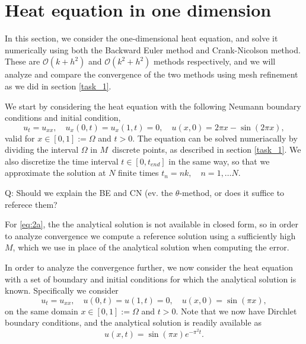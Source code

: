 \section{Heat equation in one dimension}
In this section, we consider the one-dimensional heat equation, 
and solve it numerically using both the Backward Euler method and Crank-Nicolson method. 
These are $\mathcal{O}(k+h^2)$ and $\mathcal{O}(k^2+h^2)$ methods respectively, 
and we will analyze and compare the convergence of the two methods using mesh refinement as we did in section \ref{task_1}. 

We start by considering the heat equation with the following Neumann boundary conditions and initial condition, 
\begin{equation*}
    u_t = u_{xx}, \quad u_x(0,t) = u_x(1,t) = 0, \quad u(x,0) = 2\pi x - \sin(2\pi x),
    \label{eq:2a}
\end{equation*}
valid for $x \in [0,1] := \Omega$ and $t > 0$.
The equation can be solved numeriacally by dividing the interval $\Omega$ in $M$ discrete points, 
as described in section \ref{task_1}.
We also discretize the time interval $t \in [0,t_{end}]$ in the same way, so that we approximate the solution at $N$ finite times $t_n = nk, \quad n = 1, \ldots N$.

\begin{figure}[ht]
    \centering
    
\end{figure}

Q: Should we explain the BE and CN (ev. the $\theta$-method, or does it suffice to referece them?

For \eqref{eq:2a}, the the analytical solution is not available in closed form, 
so in order to analyze convergence we compute a reference solution using a sufficiently high $M$, 
which we use in place of the analytical solution when computing the error. 

\begin{figure}[ht]
    \centering
    
\end{figure}

In order to analyze the convergence further, 
we now consider the heat equation with a set of boundary and initial conditions for which the analytical solution is known. 
Specifically we consider 
\begin{equation}
    u_t = u_{xx}, \quad u(0,t) = u(1,t) = 0, \quad u(x,0) = \sin(\pi x), 
\end{equation}
on the same domain $x \in [0,1] := \Omega$ and $t > 0$. 
Note that we now have Dirchlet boundary conditions, 
and the analytical solution is readily available as
\begin{equation}
    u(x,t) = \sin(\pi x)  e^{- \pi^2 t}.
\end{equation}

